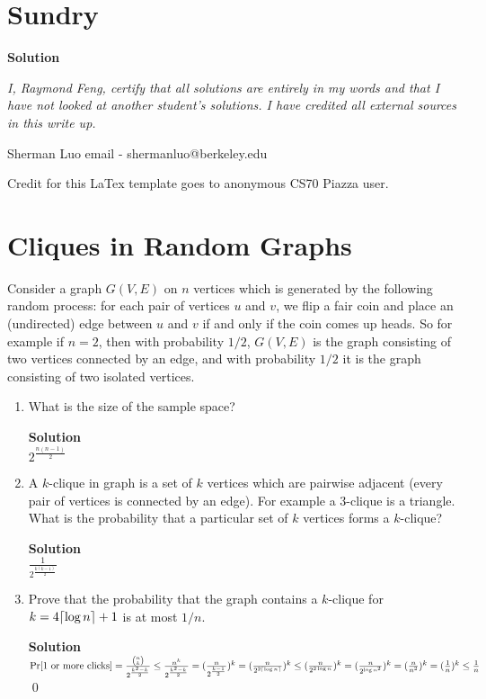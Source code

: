 \documentclass[11pt]{article}
\newcommand*{\Question}[1]{\section{#1}}
\newenvironment{Parts}{\begin{enumerate}[label=(\alph*)]}{\end{enumerate}}
\newcommand*{\Part}{\item}
\DeclarePairedDelimiter{\ceil}{\lceil}{\rceil}
\begin{document}
\Question{Sundry} 
\vspace{10pt}
\begin{mdframed} \textbf{Solution} 
\item \textit {I, Raymond Feng, certify that all solutions are entirely in my words and that I have not looked at another student's solutions. I have credited all external sources in this write up.}
\item Sherman Luo email - shermanluo@berkeley.edu
\item Credit for this LaTex template goes to anonymous CS70 Piazza user.
\end{mdframed}
\vfill\pagebreak[3]

\Question{Cliques in Random Graphs}

Consider a graph $G(V,E)$ on $n$ vertices which is generated by the following random process: for each pair of vertices $u$ and $v$, we flip a fair coin and place an (undirected) edge between $u$ and $v$ if and only if the coin comes up heads. So for example if $n = 2$, then with probability $1/2$, $G(V,E)$ is the graph consisting of two vertices connected by an edge, and with probability $1/2$ it is the graph consisting of two isolated vertices.

\begin{Parts}
\Part What is the size of the sample space?
\begin{mdframed} \textbf{Solution} \\
$2^{\frac{n(n-1)}{2}}$
\end{mdframed}
\Part A $k$-clique in graph is a set of $k$ vertices which are pairwise adjacent (every pair of vertices is connected by an edge). For example a $3$-clique is a triangle. What is the probability that a particular
set of $k$ vertices forms a $k$-clique? 
\begin{mdframed} \textbf{Solution} \\
$\frac{1}{2^{\frac{k(k-1)}{2}}}$
\end{mdframed}
	\Part Prove that the probability that the graph contains a $k$-clique for $k = 4\ceil{\log n}+1$ is at most
	$1/n$. 
\begin{mdframed} \textbf{Solution} \\
$\Pr[\text{1 or more clicks}]=\frac{\binom{n}{k}}{2^{\frac{k^2-k}{2}}} \leq \frac{n^k}{2^{\frac{k^2-k}{2}}}=(\frac{n}{2^{\frac{k-1}{2}}})^k=(\frac{n}{2^{2\ceil{\log n}}})^k \leq (\frac{n}{2^{2\log n}})^k=(\frac{n}{2^{\log n^2}})^k=(\frac{n}{n^2})^k=(\frac{1}{n})^k \leq \frac{1}{n}$ \qed
\end{mdframed}
\end{Parts}
\end{document}
